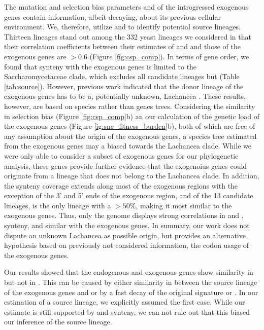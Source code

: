 \documentclass[fleqn,letterpaper]{article}
\begin{document}
The mutation and selection bias parameters \DM and \DE of the introgressed exogenous genes contain information, albeit decaying, about its previous cellular environment.
We, therefore, utilize \DM and \DE to identify potential source lineages.
Thirteen lineages stand out among the 332 yeast lineages we considered in that their correlation coefficients between their estimates of \DM and \DE and those of the exogenous genes are $> 0.6$  (Figure \ref{fig:csp_comp}).
In terms of gene order, we found that synteny with the exogenous genes is limited to the Saccharomycetaceae clade, which excludes all candidate lineages but \gossypii (Table \ref{tab:source}).
However, previous work indicated that the donor lineage of the exogenous genes has to be a, potentially unknown, Lachancea \citep{payen2009, vakirlis2016}.
These results, however, are based on species rather than genes trees.
Considering the similarity in selection bias (Figure \ref{fig:csp_comp}b) an our calculation of the genetic load of the exogenous genes (Figure \ref{ig:sne_fitness_burden}b), both of which are free of any assumption about the origin of the exogenous genes, a species tree estimated from the exogenous genes may a biased towards the Lachancea clade.
While we were only able to consider a subset of exogenous genes for our phylogenetic analysis, these genes provide further evidence that the exogenoius genes could originate from a lineage that does not belong to the Lachancea clade.
In addition, the synteny coverage extends along most of the exogenous regions with the exception of the 3' and 5' ends of the exogenous region, and of the 13 candidate lineages, \gossypii is the only lineage with a \GC $> 50 \%$, making it most similar to the exogenous genes.
Thus, only the \gossypii genome displays strong correlations in \DM and \DE, synteny, and similar \GC  with the exogenous genes.
In summary, our work does not dispute an unknown Lachancea as possible origin, but provides an alternative hypothesis based on previously not considered information, the codon usage of the exogenous genes.

Our results showed that the endogenous and exogenous genes show similarity in \DE but not in \DM. 
This can be caused by either similarity in \DE between the source lineage of the exogenous genes and \kluyveri or by a fast decay of the original signature or \DE.
In our estimation of a source lineage, we explicitly assumed the first case.
While our estimate is still supported by \GC and synteny, we can not rule out that this biased our inference of the source lineage.
\end{document}
